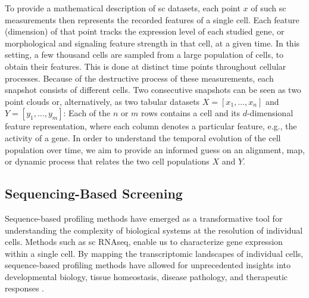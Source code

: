 To provide a mathematical description of \acrlong{sc} datasets, each point $x$ of such \acrlong{sc} measurements then represents the recorded features of a single cell. Each feature (dimension) of that point tracks the expression level of each studied gene, or morphological and signaling feature strength in that cell, at a given time. In this setting, a few thousand cells are sampled from a large population of cells, to obtain their features. This is done at distinct time points throughout cellular processes. Because of the destructive process of these measurements, each snapshot consists of different cells.
Two consecutive snapshots can be seen as two point clouds %
or, alternatively, as two tabular datasets $X = [x_1,\dots, x_n]$ and $Y=[y_1, \dots, y_m]$: Each of the $n$ or $m$ rows contains a cell and its $d$-dimensional feature representation, where each column denotes a particular feature, e.g., the activity of a gene.
In order to understand the temporal evolution of the cell population over time, we aim to provide an informed guess on an alignment, map, or dynamic process that relates the two cell populations $X$ and $Y$.

\subsection{Sequencing-Based Screening}
\label{sec:background_sequencing}

Sequence-based profiling methods have emerged as a transformative tool for understanding the complexity of biological systems at the resolution of individual cells. Methods such as \acrlong{sc} \acrshort{RNAseq}, enable us to characterize gene expression within a single cell.
By mapping the transcriptomic landscapes of individual cells, sequence-based profiling methods have allowed for unprecedented insights into developmental biology, tissue homeostasis, disease pathology, and therapeutic responses \citep{van2023applications}.

